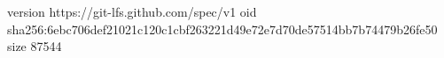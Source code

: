version https://git-lfs.github.com/spec/v1
oid sha256:6ebc706def21021c120c1cbf263221d49e72e7d70de57514bb7b74479b26fe50
size 87544
